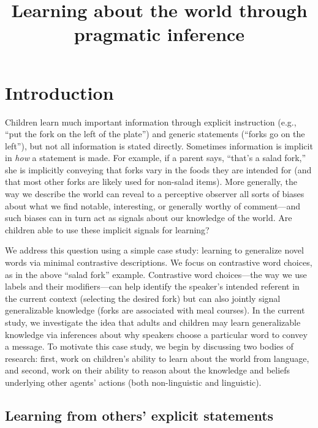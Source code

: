 \documentclass[man]{apa2}
\title{
Learning about the world through pragmatic inference}
\begin{document}
\maketitle                            


\section{Introduction}

Children learn much important information through explicit instruction (e.g., ``put the fork on the left of the plate'') and generic statements (``forks go on the left''), but not all information is stated directly. Sometimes information is implicit in \emph{how} a statement is made. For example, if a parent says, ``that's a salad fork,'' she is implicitly conveying that forks vary in the foods they are intended for (and that most other forks are likely used for non-salad items). More generally, the way we describe the world can reveal to a perceptive observer all sorts of biases about what we find notable, interesting, or generally worthy of comment---and such biases can in turn act as signals about our knowledge of the world. Are children able to use these implicit signals for learning? 

We address this question using a simple case study: learning to generalize novel words via minimal contrastive descriptions.  We focus on contrastive word choices, as in the above ``salad fork'' example. Contrastive word choices---the way we use labels and their modifiers---can help identify the speaker's intended referent in the current context (selecting the desired fork) but can also jointly signal generalizable knowledge (forks are associated with meal courses). In the current study, we investigate the idea that adults and children may learn generalizable knowledge via inferences about why speakers choose a particular word to convey a message. To motivate this case study, we begin by discussing two bodies of research: first, work on children's ability to learn about the world from language, and second, work on their ability to reason about the knowledge and beliefs underlying other agents' actions (both non-linguistic and linguistic). 


\subsection{Learning from others' explicit statements}
\end{document}
